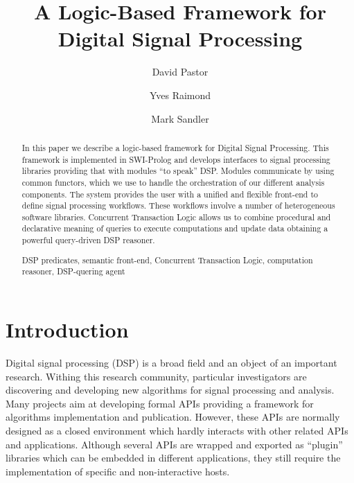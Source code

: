 \documentclass[runningheads]{llncs}
\newcommand{\keywords}[1]{\par\addvspace\baselineskip
\noindent\keywordname\enspace\ignorespaces#1}
\begin{document}
\mainmatter

\title{A Logic-Based Framework for Digital Signal Processing}


\author{David Pastor\and Yves Raimond\and Mark Sandler}


\maketitle


\begin{abstract}
In this paper we describe a logic-based framework for Digital Signal Processing. This framework is implemented in SWI-Prolog and develops interfaces to signal processing libraries providing that with modules ``to speak'' DSP. Modules communicate by using common functors, which we use to handle the orchestration of our different analysis components. The system provides the user with a unified and flexible front-end to define signal processing workflows. These workflows involve a number of heterogeneous software libraries. Concurrent Transaction Logic allows us to combine procedural and declarative meaning of queries to execute computations and update data obtaining a powerful query-driven DSP reasoner.

\keywords{DSP predicates, semantic front-end, Concurrent Transaction Logic, computation reasoner, DSP-quering agent}
\end{abstract}

\section{Introduction}\label{sec:intro}

Digital signal processing (DSP) is a broad field and an object of an important research. Withing this research community, particular investigators are discovering and developing new algorithms for signal processing and analysis. Many projects aim at developing formal APIs providing a framework for algorithms implementation and publication. However, these APIs are normally designed as a closed environment which hardly interacts with other related APIs and applications. Although several APIs are wrapped and exported as ``plugin'' libraries which can be embedded in different applications, they still require the implementation of specific and non-interactive hosts.
\end{document}
